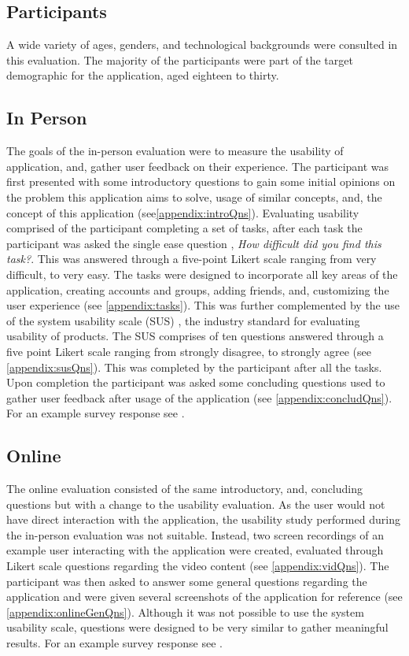 \subsection*{Participants}
A wide variety of ages, genders, and technological backgrounds were consulted in this evaluation. The majority of the participants were part of the target demographic for the application, aged eighteen to thirty. 

\subsection{In Person}
The goals of the in-person evaluation were to measure the usability of application, and, gather user feedback on their experience. The participant was first presented with some introductory questions to gain some initial opinions on the problem this application aims to solve, usage of similar concepts, and, the concept of this application (see\ref{appendix:introQns}).
Evaluating usability comprised of the participant completing a set of tasks, after each task the participant was asked the single ease question \cite{seq}, \textit{How difficult did you find this task?}. This was answered through a five-point Likert scale ranging from very difficult, to very easy. The tasks were designed to incorporate all key areas of the application, creating accounts and groups, adding friends, and, customizing the user experience (see \ref{appendix:tasks}). This was further complemented by the use of the system usability scale (SUS) \cite{sus}, the industry standard for evaluating usability of products. The SUS comprises of ten questions answered through a five point Likert scale ranging from strongly disagree, to strongly agree (see \ref{appendix:susQns}). This was completed by the participant after all the tasks. Upon completion the participant was asked some concluding questions used to gather user feedback after usage of the application (see \ref{appendix:concludQns}). 
For an example survey response see \cite{evalRespWApp}.

\subsection{Online}
The online evaluation consisted of the same introductory, and, concluding questions but with a change to the usability evaluation. As the user would not have direct interaction with the application, the usability study performed during the in-person evaluation was not suitable. Instead, two screen recordings of an example user interacting with the application were created, evaluated through Likert scale questions regarding the video content (see \ref{appendix:vidQns}). The participant was then asked to answer some general questions regarding the application and were given several screenshots of the application for reference (see \ref{appendix:onlineGenQns}). Although it was not possible to use the system usability scale, questions were designed to be very similar to gather meaningful results. For an example survey response see \cite{evalRespNoApp}. 

